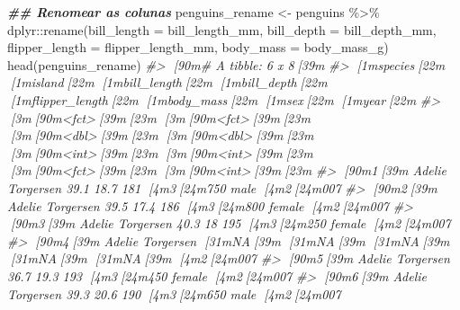 \documentclass[
]{book}
\newenvironment{Shaded}{\begin{snugshade}}{\end{snugshade}}
\newcommand{\AttributeTok}[1]{\textcolor[rgb]{0.61,0.61,0.61}{#1}}
\newcommand{\CommentTok}[1]{\textcolor[rgb]{0.37,0.37,0.37}{\textit{#1}}}
\newcommand{\DocumentationTok}[1]{\textcolor[rgb]{0.37,0.37,0.37}{\textbf{\textit{#1}}}}
\newcommand{\FunctionTok}[1]{\textcolor[rgb]{0,0,0}{#1}}
\newcommand{\NormalTok}[1]{#1}
\newcommand{\OtherTok}[1]{\textcolor[rgb]{0.37,0.37,0.37}{#1}}
\newcommand{\SpecialCharTok}[1]{\textcolor[rgb]{0,0,0}{#1}}
\begin{document}
\begin{Shaded}
\begin{Highlighting}[]
\DocumentationTok{\#\# Renomear as colunas}
\NormalTok{penguins\_rename }\OtherTok{\textless{}{-}}\NormalTok{ penguins }\SpecialCharTok{\%\textgreater{}\%} 
\NormalTok{  dplyr}\SpecialCharTok{::}\FunctionTok{rename}\NormalTok{(}\AttributeTok{bill\_length =}\NormalTok{ bill\_length\_mm,}
                \AttributeTok{bill\_depth =}\NormalTok{ bill\_depth\_mm,}
                \AttributeTok{flipper\_length =}\NormalTok{ flipper\_length\_mm,}
                \AttributeTok{body\_mass =}\NormalTok{ body\_mass\_g)}
\FunctionTok{head}\NormalTok{(penguins\_rename)}
\CommentTok{\#\textgreater{} [90m\# A tibble: 6 x 8[39m}
\CommentTok{\#\textgreater{}   [1mspecies[22m [1misland[22m    [1mbill\_length[22m [1mbill\_depth[22m [1mflipper\_length[22m [1mbody\_mass[22m [1msex[22m     [1myear[22m}
\CommentTok{\#\textgreater{}   [3m[90m\textless{}fct\textgreater{}[39m[23m   [3m[90m\textless{}fct\textgreater{}[39m[23m           [3m[90m\textless{}dbl\textgreater{}[39m[23m      [3m[90m\textless{}dbl\textgreater{}[39m[23m          [3m[90m\textless{}int\textgreater{}[39m[23m     [3m[90m\textless{}int\textgreater{}[39m[23m [3m[90m\textless{}fct\textgreater{}[39m[23m  [3m[90m\textless{}int\textgreater{}[39m[23m}
\CommentTok{\#\textgreater{} [90m1[39m Adelie  Torgersen        39.1       18.7            181      [4m3[24m750 male    [4m2[24m007}
\CommentTok{\#\textgreater{} [90m2[39m Adelie  Torgersen        39.5       17.4            186      [4m3[24m800 female  [4m2[24m007}
\CommentTok{\#\textgreater{} [90m3[39m Adelie  Torgersen        40.3       18              195      [4m3[24m250 female  [4m2[24m007}
\CommentTok{\#\textgreater{} [90m4[39m Adelie  Torgersen        [31mNA[39m         [31mNA[39m               [31mNA[39m        [31mNA[39m [31mNA[39m      [4m2[24m007}
\CommentTok{\#\textgreater{} [90m5[39m Adelie  Torgersen        36.7       19.3            193      [4m3[24m450 female  [4m2[24m007}
\CommentTok{\#\textgreater{} [90m6[39m Adelie  Torgersen        39.3       20.6            190      [4m3[24m650 male    [4m2[24m007}


\end{Highlighting}
\end{Shaded}
\end{document}
